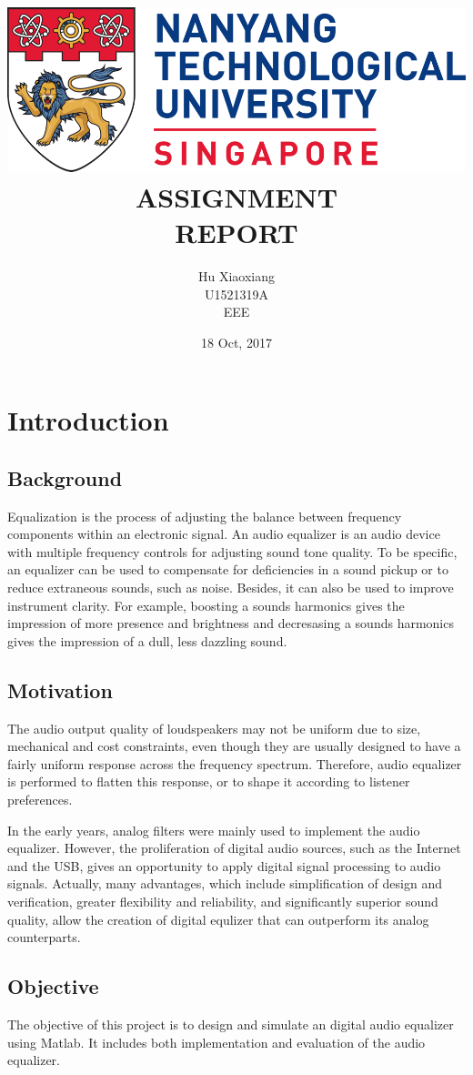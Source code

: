 \documentclass[titlepage]{article}
\author{Hu Xiaoxiang \\
U1521319A \\
EEE \\
}
\date{18 Oct, 2017 \\
}
\title{\includegraphics[width=\textwidth]{logo_ntu_new.png} \\
[5\baselineskip] ASSIGNMENT \\
REPORT \\
[5\baselineskip]}
\begin{document}
\maketitle
\tableofcontents

\newpage
{}

\section{Introduction}
\label{sec:orgc46124e}
\subsection{Background}
\label{sec:org31af3dd}
Equalization is the process of adjusting the balance between frequency
components within an electronic signal. An audio equalizer is an audio device
with multiple frequency controls for adjusting sound tone quality. To be
specific, an equalizer can be used to compensate for deficiencies in a sound
pickup or to reduce extraneous sounds, such as noise. Besides, it can also be
used to improve instrument clarity. For example, boosting a sounds harmonics
gives the impression of more presence and brightness and decresasing a sounds
harmonics gives the impression of a dull, less dazzling sound.
\subsection{Motivation}
\label{sec:org3a823db}
The audio output quality of loudspeakers may not be uniform due to size,
mechanical and cost constraints, even though they are usually designed to
have a fairly uniform response across the frequency spectrum. Therefore,
audio equalizer is performed to flatten this response, or to shape it
according to listener preferences.

In the early years, analog filters were mainly used to implement the audio
equalizer. However, the proliferation of digital audio sources, such as the
Internet and the USB, gives an opportunity to apply digital signal processing
to audio signals. Actually, many advantages, which include simplification of
design and verification, greater flexibility and reliability, and
significantly superior sound quality, allow the creation of digital equlizer
that can outperform its analog counterparts.
\subsection{Objective}
\label{sec:orgfac7921}
The objective of this project is to design and simulate an digital audio
equalizer using Matlab. It includes both implementation and evaluation of
the audio equalizer. 
\end{document}
